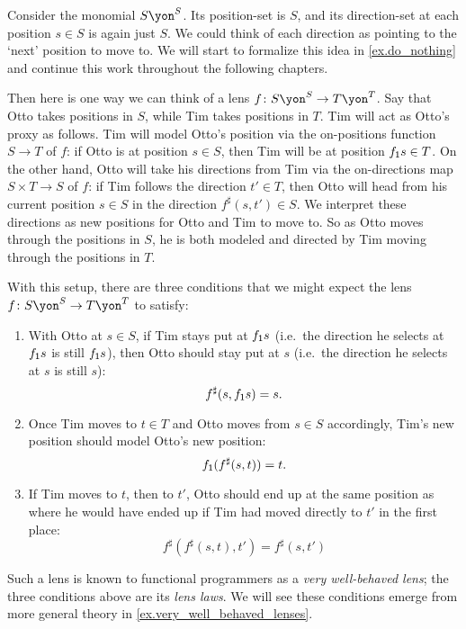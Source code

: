 \documentclass[Book-Poly]{subfiles}
\begin{document}
\begin{example} \label{ex.lens_get_put}
  Consider the monomial $S\yon^S$.
  Its position-set is $S$, and its direction-set at each position $s\in S$ is again just $S$.
  We could think of each direction as pointing to the `next' position to move to.
  We will start to formalize this idea in \cref{ex.do_nothing} and continue this work throughout the following chapters.

  Then here is one way we can think of a lens $f\colon S\yon^S\to T\yon^T$.
  Say that Otto takes positions in $S$, while Tim takes positions in $T$.
  Tim will act as Otto's proxy as follows.
  Tim will model Otto's position via the on-positions function $S\to T$ of $f$: if Otto is at position $s\in S$, then Tim will be at position $f_{\textsf{1}} s\in T$.
  On the other hand, Otto will take his directions from Tim via the on-directions map $S\times T\to S$ of $f$: if Tim follows the direction $t'\in T$, then Otto will head from his current position $s\in S$ in the direction $f^\sharp(s,t')\in S$.
  We interpret these directions as new positions for Otto and Tim to move to.
  So as Otto moves through the positions in $S$, he is both modeled and directed by Tim moving through the positions in $T$.

  With this setup, there are three conditions that we might expect the lens $f\colon S\yon^S\to T\yon^T$ to satisfy:
  \begin{enumerate}
    \item With Otto at $s\in S$, if Tim stays put at $f_{\textsf{1}}s$ (i.e.\ the direction he selects at $f_{\textsf{1}}s$ is still $f_{\textsf{1}}s$), then Otto should stay put at $s$ (i.e.\ the direction he selects at $s$ is still $s$):
    \[
      f^\sharp(s,f_{\textsf{1}}s)=s.
    \]

    \item Once Tim moves to $t\in T$ and Otto moves from $s\in S$ accordingly, Tim's new position should model Otto's new position:
    \[
      f_{\textsf{1}}(f^\sharp(s,t))=t.
    \]

    \item If Tim moves to $t$, then to $t'$, Otto should end up at the same position as where he would have ended up if Tim had moved directly to $t'$ in the first place:
    \[
      f^\sharp(f^\sharp(s,t),t')=f^\sharp(s,t')
    \]
  \end{enumerate}
  Such a lens is known to functional programmers as a \emph{very well-behaved lens}; the three conditions above are its \emph{lens laws}.
  We will see these conditions emerge from more general theory in \cref{ex.very_well_behaved_lenses}.
\end{example}
\end{document}

